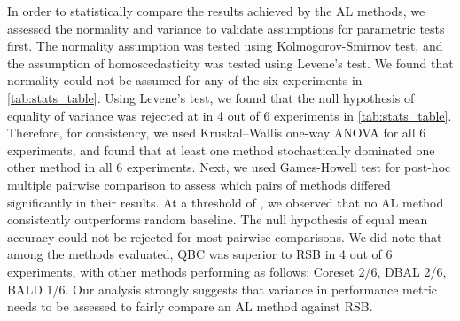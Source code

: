 \documentclass[10pt,twocolumn,letterpaper]{article}
\begin{document}
In order to statistically compare the results achieved by the AL methods, we assessed the normality and variance to validate assumptions for parametric tests first. The normality assumption was tested using Kolmogorov-Smirnov test, and the assumption of homoscedasticity was tested using Levene's test. We found that normality could not be assumed for any of the six experiments in \cref{tab:stats_table}.
Using Levene's test, we found that the null hypothesis of equality of variance was rejected at  in 4 out of 6 experiments in \cref{tab:stats_table}. Therefore, for consistency, we used Kruskal–Wallis one-way ANOVA for all 6 experiments, and found that at least one method stochastically dominated one other method in all 6 experiments. Next, we used Games-Howell test for post-hoc multiple pairwise comparison to assess which pairs of methods differed significantly in their results. At a threshold of , we observed that no AL method consistently outperforms random baseline. The null hypothesis of equal mean accuracy could not be rejected for most pairwise comparisons. We did note that among the methods evaluated, QBC was superior to RSB in 4 out of 6 experiments, with other methods performing as follows: Coreset 2/6, DBAL 2/6, BALD 1/6. Our analysis strongly suggests that variance in performance metric needs to be assessed to fairly compare an AL method against RSB.
\end{document}
